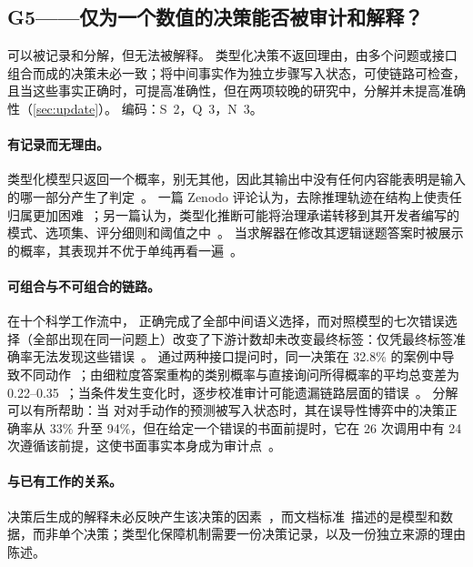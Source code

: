 \subsection{G5——仅为一个数值的决策能否被审计和解释？}
\label{sec:g5}

\begin{answerbox}
可以被记录和分解，但无法被解释。
类型化决策不返回理由，由多个问题或接口组合而成的决策未必一致；将中间事实作为独立步骤写入状态，可使链路可检查，且当这些事实正确时，可提高准确性，但在两项较晚的研究中，分解并未提高准确性（\cref{sec:update}）。
编码：S~2，Q~3，N~3。
\end{answerbox}

\paragraph{有记录而无理由。}
类型化模型只返回一个概率，别无其他，因此其输出中没有任何内容能表明是输入的哪一部分产生了判定~\cite{willison2026jev}。
一篇 Zenodo 评论认为，去除推理轨迹在结构上使责任归属更加困难~\cite{zen22847531}\zmark{}；另一篇认为，类型化推断可能将治理承诺转移到其开发者编写的模式、选项集、评分细则和阈值之中~\cite{zen22866847}\zmark{}。
当求解器在修改其逻辑谜题答案时被展示 \jev{} 的概率，其表现并不优于单纯再看一遍~\cite{zen22849329}\zmark{}。

\paragraph{可组合与不可组合的链路。}
在十个科学工作流中，\jev{} 正确完成了全部中间语义选择，而对照模型的七次错误选择（全部出现在同一问题上）改变了下游计数却未改变最终标签：仅凭最终标签准确率无法发现这些错误~\cite{arx24965}。
通过两种接口提问时，同一决策在 32.8\% 的案例中导致不同动作~\cite{arx37470}；由细粒度答案重构的类别概率与直接询问所得概率的平均总变差为 0.22--0.35~\cite{arx33971}；当条件发生变化时，逐步校准审计可能遗漏链路层面的错误~\cite{zen23064668}\zmark{}。
分解可以有所帮助：当 \jev{} 对对手动作的预测被写入状态时，其在误导性博弈中的决策正确率从 33\% 升至 94\%，但在给定一个错误的书面前提时，它在 26 次调用中有 24 次遵循该前提，这使书面事实本身成为审计点~\cite{arx01834}。

\paragraph{与已有工作的关系。}
决策后生成的解释未必反映产生该决策的因素~\cite{doshivelez2017towards}，而文档标准~\cite{mitchell2019model,gebru2021datasheets}描述的是模型和数据，而非单个决策；类型化保障机制需要一份决策记录，以及一份独立来源的理由陈述。

